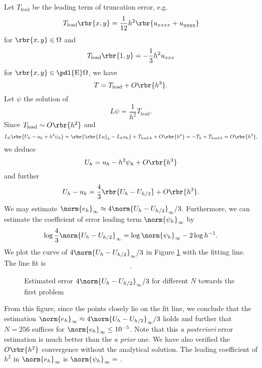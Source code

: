 \documentclass[english, nochinese]{pnote}
\newcommand\normi[1]{\norm{#1}_{\infty}}
\begin{document}
Let $T_{\text{lead}}$ be the leading term of truncation error, e.g.
\begin{equation}
T_{\text{lead}} \rbr{ x, y } = \frac{1}{12} h^2 \rbr{ u_{ x x x x } + u_{ y y y y } }
\end{equation}
for $ \rbr{ x, y } \in \Omega $ and
\begin{equation}
T_{\text{lead}} \rbr{ 1, y } = -\frac{1}{3} h^2 u_{ x x x }
\end{equation}
for $ \rbr{ x, y } \in \pdl{\text{E}} \Omega $, we have
\begin{equation}
T = T_{\text{lead}} + O \rbr{h^3}.
\end{equation}
Let $\psi$ the solution of
\begin{equation}
L \psi = \frac{1}{h^2} T_{\text{lead}}.
\end{equation}
Since $ T_{\text{lead}} \sim O \rbr{h^2} $ and
\begin{equation}
L_h \rbr{ U_h - u_h + h^2 \psi_h } = \rbr{ \rbr{ L u }_h - L_h u_h } + T_{ \text{lead}, h } + O \rbr{h^4} = -T_h + T_{ \text{lead}, h } = O \rbr{h^3},
\end{equation}
we deduce
\begin{equation}
U_h = u_h - h^2 \psi_h + O \rbr{h^3}
\end{equation}
and further
\begin{equation}
U_h - u_h = \frac{4}{3} \rbr{ U_h - U_{ h / 2 } } + O \rbr{h^3}.
\end{equation}
We may estimate $ \normi{e_h} \approx 4 \normi{ U_h - U_{ h / 2 } } / 3 $. Furthermore, we can estimate the coefficient of error leading term $\normi{\psi_h}$ by
\begin{equation}
\log \frac{4}{3} \normi{ U_h - U_{ h / 2 } } = \log \normi{\psi_h} - 2 \log h^{-1}.
\end{equation}
We plot the curve of $ 4 \normi{ U_h - U_{ h / 2 } } / 3 $ in Figure \ref{Fig:Prob1Post} with the fitting line. The line fit is
\begin{equation}
.
\end{equation}

\begin{figure}[htbp]
\centering

\caption{Estimated error $ 4 \normi{ U_h - U_{ h / 2 } } / 3 $ for different $N$ towards the first problem}
\label{Fig:Prob1Post}
\end{figure}

From this figure, since the points closely lie on the fit line, we conclude that the estimation $ \normi{e_h} \approx 4 \normi{ U_h - U_{ h / 2 } } / 3 $ holds and further that $ N = 256 $ suffices for $ \normi{e_h} \le 10^{-5} $. Note that this \textit{a posteriori} error estimation is much better than the \textit{a prior} one. We have also verified the $ O \rbr{h^2} $ convergence without the analytical solution. The leading coefficient of $h^2$ in $\normi{e_h}$ is $ \normi{\psi_h} = \text{} $.
\end{document}
